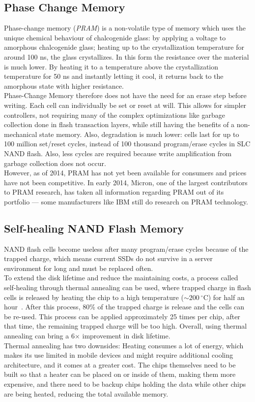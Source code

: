 \documentclass{acm_proc_article-sp}
\begin{document}
\subsection{Phase Change Memory}
Phase-change memory (\emph{PRAM}) is a non-volatile type of memory which uses the unique chemical behaviour of chalcogenide glass: by applying a voltage to amorphous chalcogenide glass; heating up to the crystallization temperature for around 100 ns, the glass crystallizes. In this form the resistance over the material is much lower. By heating it to a temperature above the crystallization temperature for 50 ns and instantly letting it cool, it returns back to the amorphous state with higher resistance.
\\
Phase-Change Memory therefore does not have the need for an erase step before writing. Each cell can individually be set or reset at will. This allows for simpler controllers, not requiring many of the complex optimizations like garbage collection done in flash transaction layers, while still having the benefits of a non-mechanical state memory. Also, degradation is much lower: cells last for up to 100 million set/reset cycles, instead of 100 thousand program/erase cycles in SLC NAND flash. Also, less cycles are required because write amplification from garbage collection does not occur.
\\
However, as of 2014, PRAM has not yet been available for consumers and prices have not been competitive. In early 2014, Micron, one of the largest contributors to PRAM research, has taken all information regarding PRAM out of its portfolio --- some manufacturers like IBM still do research on PRAM technology.

\subsection{Self-healing NAND Flash Memory}
NAND flash cells become useless after many program/erase cycles because of the trapped charge, which means current SSDs do not survive in a server environment for long and must be replaced often.
\\
To extend the disk lifetime and reduce the maintaining costs, a process called self-healing through thermal annealing can be used, where trapped charge in flash cells is released by heating the chip to a high temperature ($\sim 200~^{\circ}$C) for half an hour~\cite{wu2011exploiting}. After this process, 80\% of the trapped charge is release and the cells can be re-used. This process can be applied approximately 25 times per chip, after that time, the remaining trapped charge will be too high. Overall, using thermal annealing can bring a 6$\times$ improvement in disk lifetime.
\\
Thermal annealing has two downsides: Heating consumes a lot of energy, which makes its use limited in mobile devices and might require additional cooling architecture, and it comes at a greater cost. The chips themselves need to be built so that a heater can be placed on or inside of them, making them more expensive, and there need to be backup chips holding the data while other chips are being heated, reducing the total available memory.
\end{document}

